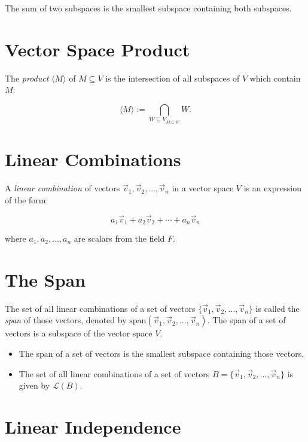 The sum of two subspaces is the smallest subspace containing both subspaces.

\section{Vector Space Product}

The \emph{product} \(\langle M \rangle\) of \(M \subseteq V\) is the intersection of all subspaces of \(V\) which contain \(M\):

\[
	\langle M \rangle := \bigcap_{{W \subseteq V}_{M \subseteq W}} W.
\]

\section{Linear Combinations}

A \emph{linear combination} of vectors \(\vec{v}_1, \vec{v}_2, \ldots, \vec{v}_n\) in a vector space
\(V\) is an expression of the form:

\[
	a_1\vec{v}_1 + a_2\vec{v}_2 + \cdots + a_n\vec{v}_n
\]

where \(a_1, a_2, \ldots, a_n\) are scalars from the field \(F\).


\section{The Span}

The set of all linear combinations of a set of vectors \(\{\vec{v}_1, \vec{v}_2, \ldots, \vec{v}_n\}\)
is called the \emph{span} of those vectors, denoted by \(\mathrm{span}(\vec{v}_1, \vec{v}_2, \ldots, \vec{v}_n)\). The span of a set of vectors is a
subspace of the vector space \(V\).

\begin{itemize}

	\item The span of a set of vectors is the smallest subspace containing those vectors.

	\item The set of all linear combinations of a set of vectors \(B = \{\vec{v}_1, \vec{v}_2, \ldots, \vec{v}_n\}\) is given by \(\mathcal{L}(B)\).

\end{itemize}

\section{Linear Independence}

